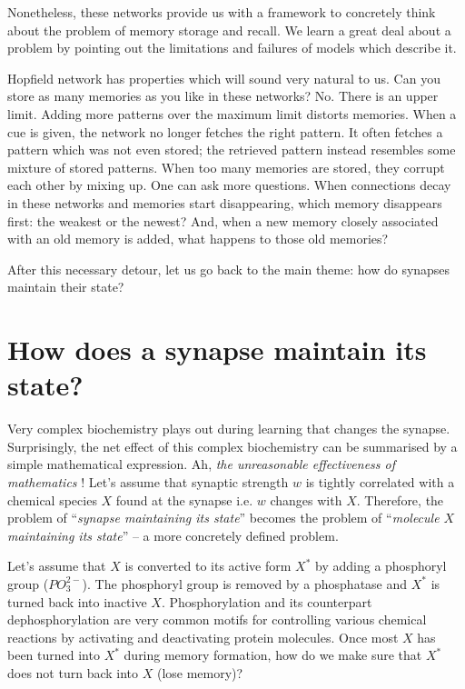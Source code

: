 \documentclass[]{resonance}
\begin{document}

Nonetheless, these networks provide us with a framework to concretely think
about the problem of memory storage and recall. We learn a great deal about a
problem by pointing out the limitations and failures of models which describe it. 

Hopfield network has properties which will sound very natural to us. Can you
store as many memories as you like in these networks? No. There is an upper
limit. Adding more patterns over the maximum limit distorts memories.  When a
cue is given, the network no longer fetches the right pattern. It often fetches
a pattern which was not even stored; the retrieved pattern instead resembles
some mixture of stored patterns. When too many memories are stored, they corrupt
each other by mixing up. One can ask more questions. When connections decay in
these networks and memories start disappearing, which memory disappears first:
the weakest or the newest? And, when a new memory closely associated with an old
memory is added, what happens to those old memories?

After this necessary detour, let us go back to the main theme: how do synapses
maintain their state?

\section{How does a synapse maintain its state?}

Very complex biochemistry plays out during learning that changes the synapse.
Surprisingly, the net effect of this complex biochemistry can be summarised by a
simple mathematical expression. Ah, \emph{the unreasonable effectiveness of
mathematics} \cite{unreasonable_math}! Let's assume that synaptic strength $w$ is
tightly correlated with a chemical species $X$ found at the synapse i.e. $w$ changes
with $X$. Therefore, the problem of ``\emph{synapse
maintaining its state}'' becomes the problem of ``\emph{molecule $X$ maintaining
its state}'' -- a more concretely defined problem.

Let's assume that $X$ is converted to its active form $X^*$  by adding a
phosphoryl group ($PO_3^{2-}$). The phosphoryl group is removed by a phosphatase
and $X^*$ is turned back into inactive $X$. Phosphorylation and its
counterpart dephosphorylation are very common motifs for controlling various
chemical reactions by activating and deactivating protein molecules. Once most
$X$ has been turned into $X^*$ during memory formation, how do we make sure that
$X^*$ does not turn back into $X$ (lose memory)?
\end{document}
